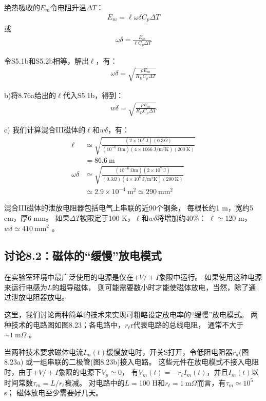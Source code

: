 绝热吸收的$E_m$令电阻升温$\Delta T$：
\begin{align*}%
E_m=\ell\omega\delta C_p\Delta T \tag{S5.2a}
\end{align*}
或
\begin{align*}%
\omega\delta=\frac{E_m}{\ell C_p\Delta T} \tag{S5.2b}
\end{align*}

令S5.1b和S5.2b相等，解出$\ell$，有：
\begin{align*}%
\omega\delta=\sqrt{\frac{\rho E_m}{R_DC_p\Delta T}} \tag{8.76a}
\end{align*}

b)将8.76a给出的$\ell$代入S5.1b，得到：
\begin{align*}
w\delta=\sqrt{\frac{\rho E_m}{R_D C_p \Delta T}} \tag{8.76b}
\end{align*}

c) 我们计算混合III磁体的$\ell$和$w\delta$，有：
\begin{align*}
\ell&\simeq\sqrt{\frac{(2\times 10^7\ \mathrm{J})(0.3\Omega)}{(10^{-6}\ \mathrm{\Omega m})(4\times 1066\ \mathrm{J/m^2K})(200\ \mathrm{K})}} \\
&=86.6\ \mathrm{m}\\
\omega\delta&\simeq\sqrt{\frac{(10^{-6}\ \mathrm{\Omega m})(2\times 10^7\ \mathrm{J})}{(0.3\Omega)(4\times 10^6\ \mathrm{J/m^2K})(200\ \mathrm{K})}} \\
&\simeq 2.9\times 10^{-4}\ \mathrm{m^2}\simeq 290\ \mathrm{mm^2}
\end{align*}

混合III磁体的泄放电阻器包括电气上串联的近90个钢条，
每根长约1 m，宽约5 cm，厚6 mm。
如果$\Delta T$被限定于100 K，$\ell$和$w\delta$将增加约40\%：
$\ell\simeq$120 m，$w\delta\simeq 410\ \mathrm{mm^2}$ 。


\subsection{讨论8.2：磁体的“缓慢”放电模式}
在实验室环境中最广泛使用的电源是仅在$+ V / + I$象限中运行。
如果使用这种电源来运行电感为$L$的超导磁体，
则可能需要数小时才能使磁体放电，当然，除了通过泄放电阻器放电。

这里，我们讨论两种简单的技术来实现可粗略设定放电率的“缓慢”放电模式。
两种技术的电路图如图8.23；各电路中，$r_\ell$r代表电路的总线电阻，
通常不大于$\sim 1\ \mathrm{m}\Omega$ 。

当两种技术要求磁体电流$I_m(t)$缓慢放电时，开关S打开，令低阻电阻器$r_d$(图8.23a)
或一组串联的二极管(图8.23b)接入电路。
这些元件在放电模式不接入电阻时，由于$+V/+I$象限的电源下$V_p\simeq 0$，
有$V_m(t)=-r_\ell I_m(t)$，并且$I_m(t)$以时间常数$\tau_m=L/r_\ell$衰减。
对电路中的$L=$100 H和$r_\ell=1\ \mathrm{m}\Omega$而言，有$\tau_m\simeq 10^5$ s；
磁体放电至少需要好几天。

